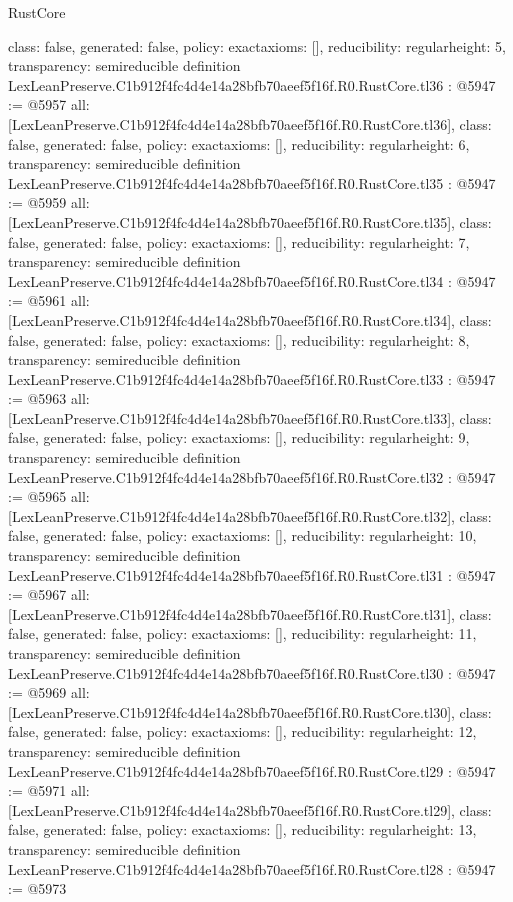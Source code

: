 \begin{lexlean}{RustCore}
\begin{coremodule}
{  class: false,
  generated: false,
  policy: exact{axioms: []},
  reducibility: regular{height: 5},
  transparency: semireducible
}
definition LexLeanPreserve.C1b912f4fc4d4e14a28bfb70aeef5f16f.R0.RustCore.tl36 : @5947 := @5957 {
  all: [LexLeanPreserve.C1b912f4fc4d4e14a28bfb70aeef5f16f.R0.RustCore.tl36],
  class: false,
  generated: false,
  policy: exact{axioms: []},
  reducibility: regular{height: 6},
  transparency: semireducible
}
definition LexLeanPreserve.C1b912f4fc4d4e14a28bfb70aeef5f16f.R0.RustCore.tl35 : @5947 := @5959 {
  all: [LexLeanPreserve.C1b912f4fc4d4e14a28bfb70aeef5f16f.R0.RustCore.tl35],
  class: false,
  generated: false,
  policy: exact{axioms: []},
  reducibility: regular{height: 7},
  transparency: semireducible
}
definition LexLeanPreserve.C1b912f4fc4d4e14a28bfb70aeef5f16f.R0.RustCore.tl34 : @5947 := @5961 {
  all: [LexLeanPreserve.C1b912f4fc4d4e14a28bfb70aeef5f16f.R0.RustCore.tl34],
  class: false,
  generated: false,
  policy: exact{axioms: []},
  reducibility: regular{height: 8},
  transparency: semireducible
}
definition LexLeanPreserve.C1b912f4fc4d4e14a28bfb70aeef5f16f.R0.RustCore.tl33 : @5947 := @5963 {
  all: [LexLeanPreserve.C1b912f4fc4d4e14a28bfb70aeef5f16f.R0.RustCore.tl33],
  class: false,
  generated: false,
  policy: exact{axioms: []},
  reducibility: regular{height: 9},
  transparency: semireducible
}
definition LexLeanPreserve.C1b912f4fc4d4e14a28bfb70aeef5f16f.R0.RustCore.tl32 : @5947 := @5965 {
  all: [LexLeanPreserve.C1b912f4fc4d4e14a28bfb70aeef5f16f.R0.RustCore.tl32],
  class: false,
  generated: false,
  policy: exact{axioms: []},
  reducibility: regular{height: 10},
  transparency: semireducible
}
definition LexLeanPreserve.C1b912f4fc4d4e14a28bfb70aeef5f16f.R0.RustCore.tl31 : @5947 := @5967 {
  all: [LexLeanPreserve.C1b912f4fc4d4e14a28bfb70aeef5f16f.R0.RustCore.tl31],
  class: false,
  generated: false,
  policy: exact{axioms: []},
  reducibility: regular{height: 11},
  transparency: semireducible
}
definition LexLeanPreserve.C1b912f4fc4d4e14a28bfb70aeef5f16f.R0.RustCore.tl30 : @5947 := @5969 {
  all: [LexLeanPreserve.C1b912f4fc4d4e14a28bfb70aeef5f16f.R0.RustCore.tl30],
  class: false,
  generated: false,
  policy: exact{axioms: []},
  reducibility: regular{height: 12},
  transparency: semireducible
}
definition LexLeanPreserve.C1b912f4fc4d4e14a28bfb70aeef5f16f.R0.RustCore.tl29 : @5947 := @5971 {
  all: [LexLeanPreserve.C1b912f4fc4d4e14a28bfb70aeef5f16f.R0.RustCore.tl29],
  class: false,
  generated: false,
  policy: exact{axioms: []},
  reducibility: regular{height: 13},
  transparency: semireducible
}
definition LexLeanPreserve.C1b912f4fc4d4e14a28bfb70aeef5f16f.R0.RustCore.tl28 : @5947 := @5973 {
}
\end{coremodule}
\end{lexlean}
